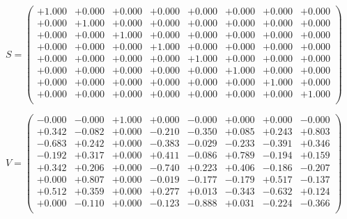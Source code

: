 \documentclass[9pt]{article}
\theoremstyle{plain}
\theoremstyle{definition}
\theoremstyle{remark}
\numberwithin{equation}{section}
\begin{document}
$S = \left(
\begin{array}{
cccccccc}
+1.000 & +0.000 & +0.000 & +0.000 & +0.000 & +0.000 & +0.000 & +0.000 \\
+0.000 & +1.000 & +0.000 & +0.000 & +0.000 & +0.000 & +0.000 & +0.000 \\
+0.000 & +0.000 & +1.000 & +0.000 & +0.000 & +0.000 & +0.000 & +0.000 \\
+0.000 & +0.000 & +0.000 & +1.000 & +0.000 & +0.000 & +0.000 & +0.000 \\
+0.000 & +0.000 & +0.000 & +0.000 & +1.000 & +0.000 & +0.000 & +0.000 \\
+0.000 & +0.000 & +0.000 & +0.000 & +0.000 & +1.000 & +0.000 & +0.000 \\
+0.000 & +0.000 & +0.000 & +0.000 & +0.000 & +0.000 & +1.000 & +0.000 \\
+0.000 & +0.000 & +0.000 & +0.000 & +0.000 & +0.000 & +0.000 & +1.000 \\
\end{array}
\right)$ \newline 

$V = \left(
\begin{array}{
cccccccc}
-0.000 & -0.000 & +1.000 & +0.000 & -0.000 & +0.000 & +0.000 & -0.000 \\
+0.342 & -0.082 & +0.000 & -0.210 & -0.350 & +0.085 & +0.243 & +0.803 \\
-0.683 & +0.242 & +0.000 & -0.383 & -0.029 & -0.233 & -0.391 & +0.346 \\
-0.192 & +0.317 & +0.000 & +0.411 & -0.086 & +0.789 & -0.194 & +0.159 \\
+0.342 & +0.206 & +0.000 & -0.740 & +0.223 & +0.406 & -0.186 & -0.207 \\
+0.000 & +0.807 & +0.000 & -0.019 & -0.177 & -0.179 & +0.517 & -0.137 \\
+0.512 & +0.359 & +0.000 & +0.277 & +0.013 & -0.343 & -0.632 & +0.124 \\
+0.000 & -0.110 & +0.000 & -0.123 & -0.888 & +0.031 & -0.224 & -0.366 \\
\end{array}
\right)$ \newline 
\end{document}

